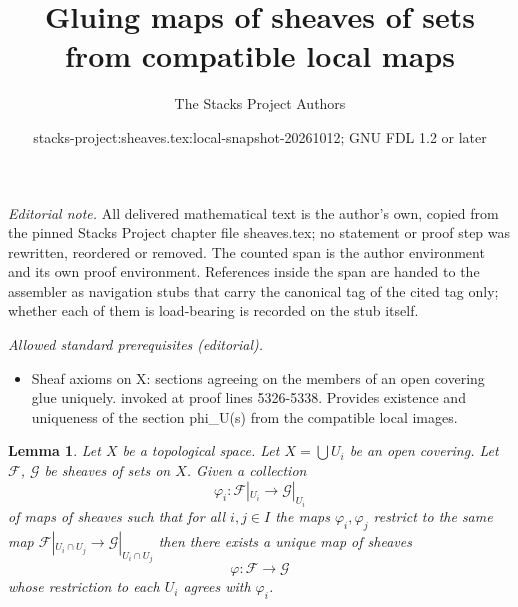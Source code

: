 \documentclass{stacks-project}
\title{Gluing maps of sheaves of sets from compatible local maps}
\author{The Stacks Project Authors}
\date{stacks-project:sheaves.tex:local-snapshot-20261012; GNU FDL 1.2 or later}
\theoremstyle{plain}
\newtheorem{lemma}[subsection]{Lemma}
\theoremstyle{definition}
\theoremstyle{remark}
\numberwithin{equation}{subsection}
\begin{document}
\maketitle
\setcounter{subsection}{1}
\noindent\textit{Editorial note.} All delivered mathematical text is the author's own, copied from the pinned Stacks Project chapter file sheaves.tex; no statement or proof step was rewritten, reordered or removed. The counted span is the author environment and its own proof environment. References inside the span are handed to the assembler as navigation stubs that carry the canonical tag of the cited tag only; whether each of them is load-bearing is recorded on the stub itself.\par\medskip
\noindent\textit{Allowed standard prerequisites (editorial).}\begin{itemize}
\item Sheaf axioms on X: sections agreeing on the members of an open covering glue uniquely. invoked at proof lines 5326-5338. Provides existence and uniqueness of the section phi\_U(s) from the compatible local images.
\end{itemize}\medskip
\begin{lemma}
\label{lemma-glue-maps}
Let $X$ be a topological space.
Let $X = \bigcup U_i$ be an open covering.
Let $\mathcal{F}$, $\mathcal{G}$ be sheaves of sets on $X$.
Given a collection
$$
\varphi_i :
\mathcal{F}|_{U_i}
\longrightarrow
\mathcal{G}|_{U_i}
$$
of maps of sheaves such that for all $i, j \in I$ the maps
$\varphi_i, \varphi_j$ restrict to the same map
$\mathcal{F}|_{U_i \cap U_j} \to \mathcal{G}|_{U_i \cap U_j}$
then there exists a unique map of sheaves
$$
\varphi :
\mathcal{F}
\longrightarrow
\mathcal{G}
$$
whose restriction to each $U_i$ agrees with $\varphi_i$.
\end{lemma}
\end{document}
